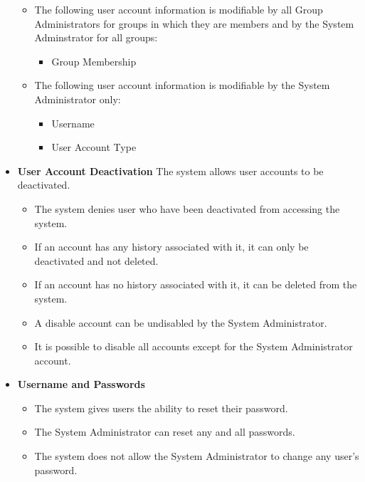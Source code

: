 \documentclass{report}
\begin{document}
\begin{itemize}
\begin{itemize}
					\item The following user account information is modifiable
					by all Group Administrators for groups in which they are 
						members and by the System Adminstrator for all groups:
						\begin{itemize}
							\item Group Membership
						\end{itemize}

					\item The following user account information is modifiable
					by the System Administrator only:
						\begin{itemize}
							\item Username
							\item User Account Type
						\end{itemize}
				\end{itemize}
				
				\item \textbf{User Account Deactivation} The system allows user 
				accounts to be deactivated.
					\begin{itemize}
						\item The system denies user who have been deactivated 
						from accessing the system.
						\item If an account has any history associated with it, 
						it can only be deactivated and not deleted.
						\item If an account has no history associated with it, 
						it can be deleted from the system.
						\item A disable account can be undisabled by the System 
						Administrator.
						\item It is possible to disable all accounts except for 
						the System Administrator account.
					\end{itemize}					

				\item \textbf{Username and Passwords}
					\begin{itemize}
						\item The system gives users the ability to reset their 
						password.
						\item The System Administrator can reset any and all 
						passwords.
						\item The system does not allow the System Administrator 
						to change any user's password.
					\end{itemize}
			\end{itemize}
\end{document}
